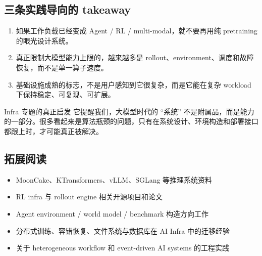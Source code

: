 \documentclass[a4paper]{article}
\begin{document}
\subsection{三条实践导向的 takeaway}
\begin{enumerate}
  \item 如果工作负载已经变成 Agent / RL / multi-modal，就不要再用纯 pretraining 的眼光设计系统。
  \item 真正限制大模型能力上限的，越来越多是 rollout、environment、调度和故障恢复，而不是单一算子速度。
  \item 基础设施成熟的标志，不是用户感知到它很复杂，而是它能在复杂 workload 下保持稳定、可复现、可扩展。
\end{enumerate}

\begin{importantbox}{Infra 专题的真正启发}
它提醒我们，大模型时代的 ``系统'' 不是附属品，而是能力的一部分。很多看起来是算法瓶颈的问题，只有在系统设计、环境构造和部署接口都跟上时，才可能真正被解决。
\end{importantbox}

\subsection{拓展阅读}
\begin{itemize}
  \item MoonCake、KTransformers、vLLM、SGLang 等推理系统资料
  \item RL infra 与 rollout engine 相关开源项目和论文
  \item Agent environment / world model / benchmark 构造方向工作
  \item 分布式训练、容错恢复、文件系统与数据库在 AI Infra 中的迁移经验
  \item 关于 heterogeneous workflow 和 event-driven AI systems 的工程实践
\end{itemize}
\end{document}
